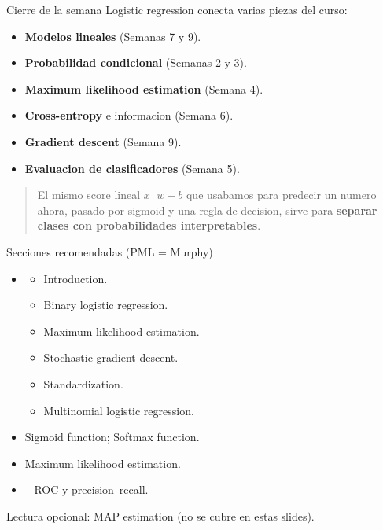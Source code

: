 \begin{frame}{Cierre de la semana}
Logistic regression conecta varias piezas del curso:
\begin{itemize}\small
  \item \textbf{Modelos lineales} (Semanas 7 y 9).
  \item \textbf{Probabilidad condicional} (Semanas 2 y 3).
  \item \textbf{Maximum likelihood estimation} (Semana 4).
  \item \textbf{Cross-entropy} e informacion (Semana 6).
  \item \textbf{Gradient descent} (Semana 9).
  \item \textbf{Evaluacion de clasificadores} (Semana 5).
\end{itemize}

\vspace{0.3em}
\begin{quote}\small
El mismo score lineal $x^\top w + b$ que usabamos para predecir un numero ahora, pasado por sigmoid y una regla de decision, sirve para \textbf{separar clases con probabilidades interpretables}.
\end{quote}
\end{frame}

\begin{frame}{Secciones recomendadas (PML = Murphy)}
\begin{itemize}\small
  \item {}
  \begin{itemize}\footnotesize
    \item {} Introduction.
    \item {} Binary logistic regression.
    \item {} Maximum likelihood estimation.
    \item {} Stochastic gradient descent.
    \item {} Standardization.
    \item {} Multinomial logistic regression.
  \end{itemize}
  \item {}  Sigmoid function;  Softmax function.
  \item {}  Maximum likelihood estimation.
  \item {} -- ROC y precision--recall.
\end{itemize}

\vspace{0.2em}
{\footnotesize Lectura opcional:  MAP estimation (no se cubre en estas slides).}
\end{frame}

